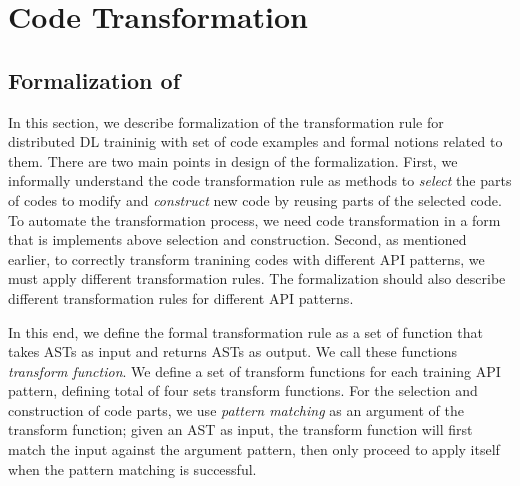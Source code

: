 \pagebreak
\section{Code Transformation}\label{sec:trans}

\subsection{Formalization of }

In this section, we describe formalization of the transformation rule
for distributed DL traininig with set of code examples and formal notions
related to them.
There are two main points in design of the formalization.
First, we informally understand the code transformation rule as methods to
\textit{select} the parts of codes to modify and \textit{construct} new code by 
reusing parts of the selected code.
To automate the transformation process, we need code transformation in a form 
that is implements above selection and construction.
Second, as mentioned earlier, to correctly transform tranining codes with different
API patterns, we must apply different transformation rules.
The formalization should also describe different transformation rules
for different API patterns.

In this end, we define the formal transformation rule as a set of
function that takes ASTs as input and returns ASTs as output.
We call these functions \textit{transform function}.
We define a set of transform functions for each training API pattern,
defining total of four sets transform functions.
For the selection and construction of code parts,
we use \textit{pattern matching} as an argument of the transform function;
given an AST as input, the transform function will first match the
input against the argument pattern, then only proceed to apply itself
when the pattern matching is successful.

